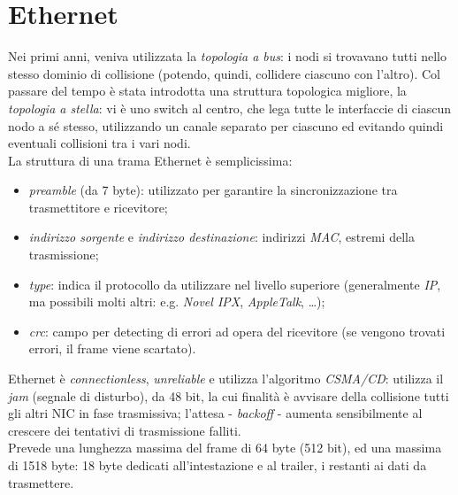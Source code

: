 \section{Ethernet}
Nei primi anni, veniva utilizzata la \textit{topologia a bus}: i nodi si trovavano tutti nello stesso dominio di collisione (potendo, quindi, collidere ciascuno con l'altro). Col passare del tempo è stata introdotta una struttura topologica migliore, la \textit{topologia a stella}: vi è uno switch al centro, che lega tutte le interfaccie di ciascun nodo a sé stesso, utilizzando un canale separato per ciascuno ed evitando quindi eventuali collisioni tra i vari nodi. \\
La struttura di una trama Ethernet è semplicissima:
\begin{itemize}
	\item \textit{preamble} (da 7 byte): utilizzato per garantire la sincronizzazione tra trasmettitore e ricevitore;
	\item \textit{indirizzo sorgente} e \textit{indirizzo destinazione}: indirizzi \textit{MAC}, estremi della trasmissione;
	\item \textit{type}: indica il protocollo da utilizzare nel livello superiore (generalmente \textit{IP}, ma possibili molti altri: e.g. \textit{Novel IPX}, \textit{AppleTalk}, \ldots);
	\item \textit{crc}: campo per detecting di errori ad opera del ricevitore (se vengono trovati errori, il frame viene scartato).
\end{itemize}
Ethernet è \textit{connectionless}, \textit{unreliable} e utilizza l'algoritmo \textit{CSMA/CD}: utilizza il \textit{jam} (segnale di disturbo), da 48 bit, la cui finalità è avvisare della collisione tutti gli altri NIC in fase trasmissiva; l'attesa - \textit{backoff} - aumenta sensibilmente al crescere dei tentativi di trasmissione falliti. \\
Prevede una lunghezza massima del frame di 64 byte (512 bit), ed una massima di 1518 byte: 18 byte dedicati all'intestazione e al trailer, i restanti ai dati da trasmettere.
\newpage

